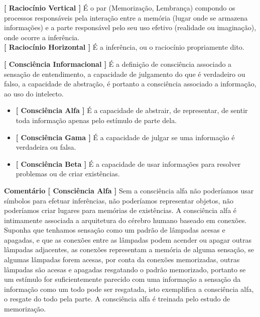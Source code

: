 \documentclass[10pt,a4paper]{report}
\begin{document}
\textbf{[ Raciocínio Vertical ]} É o par (Memorização, Lembrança) compondo os processos responsáveis pela interação entre a memória (lugar onde se armazena informações) e a parte responsável pelo seu uso efetivo (realidade ou imaginação), onde ocorre a inferência.\\

\textbf{[ Raciocínio Horizontal ]} É a inferência, ou o raciocínio propriamente dito.


\hspace{\baselineskip}

\textbf{[ Consciência Informacional ]} É a definição de consciência associado a sensação de entendimento, a capacidade de julgamento do que é verdadeiro ou falso, a capacidade de abstração, é portanto a consciência associado a informação, ao uso do intelecto.

\begin{itemize}
	\item[ (i) ] \textbf{[ Consciência Alfa ]} É a capacidade de abstrair, de representar, de sentir toda informação apenas pelo estímulo de parte dela. %
	\item[ (ii) ] \textbf{[ Consciência Gama ]} É a capacidade de julgar se uma informação é verdadeira ou falsa. 
	\item[ (iii) ] \textbf{[ Consciência Beta ]} É a capacidade de usar informações para resolver problemas ou de criar existências.
\end{itemize}

\textbf{Comentário [ Consciência Alfa ]} Sem a consciência alfa não poderíamos usar símbolos para efetuar inferências, não poderíamos representar objetos, não poderíamos criar lugares para memórias de existências. A consciência alfa é intimamente associada a arquitetura do cérebro humano baseado em conexões. Suponha que tenhamos sensação como um padrão de lâmpadas acesas e apagadas, e que as conexões entre as lâmpadas podem acender ou apagar outras lâmpadas adjacentes, as conexões representam a memória de alguma sensação, se algumas lâmpadas forem acesas, por conta da conexões memorizadas, outras lâmpadas são acesas e apagadas resgatando o padrão memorizado, portanto se um estímulo for suficientemente parecido com uma informação a sensação da informação como um todo pode ser resgatada, isto exemplifica a consciência alfa, o resgate do todo pela parte. A consciência alfa é treinada pelo estudo de memorização. \\
\end{document}
